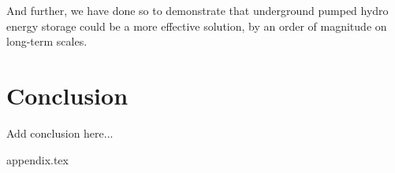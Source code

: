 \documentclass[hidelinks,12pt,a4paper]{article}
\begin{document}
And further, we have done so to demonstrate that underground pumped hydro energy storage could be a more effective solution, by an order of magnitude on long-term scales.

\pagebreak[1]
\section{Conclusion}
Add conclusion here...


{appendix.tex}




{\footnotesize


}





\end{document}
